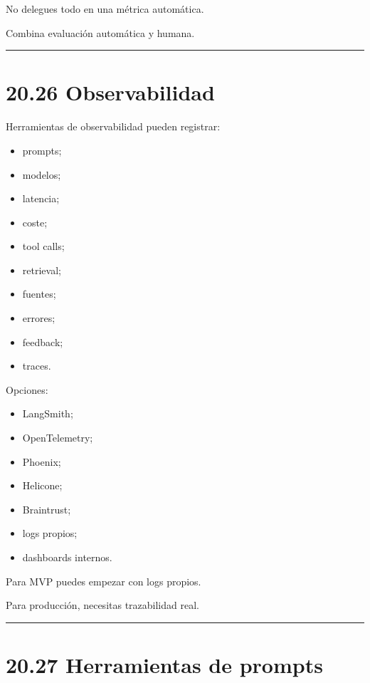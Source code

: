 No delegues todo en una métrica automática.

Combina evaluación automática y humana.

\begin{center}\rule{0.5\linewidth}{0.5pt}\end{center}

\section{20.26 Observabilidad}\label{observabilidad}

Herramientas de observabilidad pueden registrar:

\begin{itemize}
\tightlist
\item
  prompts;
\item
  modelos;
\item
  latencia;
\item
  coste;
\item
  tool calls;
\item
  retrieval;
\item
  fuentes;
\item
  errores;
\item
  feedback;
\item
  traces.
\end{itemize}

Opciones:

\begin{itemize}
\tightlist
\item
  LangSmith;
\item
  OpenTelemetry;
\item
  Phoenix;
\item
  Helicone;
\item
  Braintrust;
\item
  logs propios;
\item
  dashboards internos.
\end{itemize}

Para MVP puedes empezar con logs propios.

Para producción, necesitas trazabilidad real.

\begin{center}\rule{0.5\linewidth}{0.5pt}\end{center}

\section{20.27 Herramientas de prompts}\label{herramientas-de-prompts}

